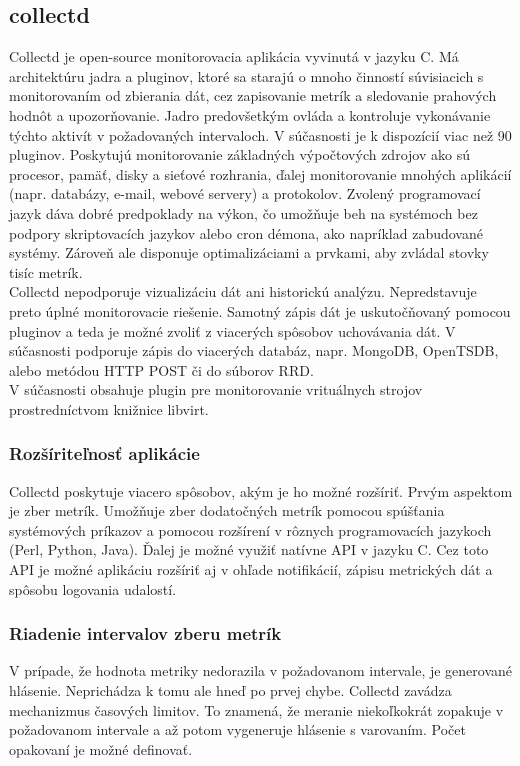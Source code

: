 \documentclass[printed,11pt,twoside,color,cover,table]{fithesis3}
\begin{document}
\subsection{collectd}
Collectd je open-source monitorovacia aplikácia vyvinutá v jazyku C. Má architektúru jadra a pluginov, ktoré sa starajú o mnoho činností súvisiacich s monitorovaním od zbierania dát, cez
zapisovanie metrík a sledovanie prahových hodnôt a upozorňovanie. Jadro predovšetkým ovláda a kontroluje vykonávanie týchto aktivít v požadovaných intervaloch. 
V súčasnosti je k dispozícií viac než 90 pluginov. Poskytujú monitorovanie základných výpočtových zdrojov ako sú procesor, pamäť, disky a sieťové rozhrania, ďalej monitorovanie
mnohých aplikácií (napr. databázy, e-mail, webové servery) a protokolov. Zvolený programovací jazyk dáva dobré predpoklady na výkon, čo umožňuje beh na systémoch bez podpory
skriptovacích jazykov alebo cron démona, ako napríklad zabudované systémy. Zároveň ale disponuje optimalizáciami a prvkami, aby zvládal stovky tisíc metrík.\cite{collectd} 
\\Collectd nepodporuje vizualizáciu dát ani historickú analýzu. Nepredstavuje preto úplné monitorovacie riešenie. Samotný zápis dát je uskutočňovaný pomocou pluginov a 
teda je možné zvoliť z viacerých spôsobov uchovávania dát. V súčasnosti podporuje zápis do viacerých databáz, napr. MongoDB, OpenTSDB, alebo metódou HTTP POST či do súborov RRD. 
\\V súčasnosti obsahuje plugin pre monitorovanie vrituálnych strojov prostredníctvom knižnice libvirt.

\subsubsection{Rozšíriteľnosť aplikácie}
Collectd poskytuje viacero spôsobov, akým je ho možné rozšíriť. Prvým aspektom je zber metrík. Umožňuje zber dodatočných metrík pomocou
spúšťania systémových príkazov a pomocou rozšírení v rôznych programovacích jazykoch (Perl, Python, Java). Ďalej je možné využiť natívne
API v jazyku C. Cez toto API je možné aplikáciu rozšíriť aj v ohľade notifikácií, zápisu metrických dát a spôsobu logovania udalostí.

\subsubsection{Riadenie intervalov zberu metrík}
V prípade, že hodnota metriky nedorazila v požadovanom intervale, je generované hlásenie. Neprichádza k tomu ale hneď po prvej chybe. Collectd zavádza mechanizmus časových limitov.
To znamená, že meranie niekoľkokrát zopakuje v požadovanom intervale a až potom vygeneruje hlásenie s varovaním. Počet opakovaní
je možné definovať. 
\end{document}
